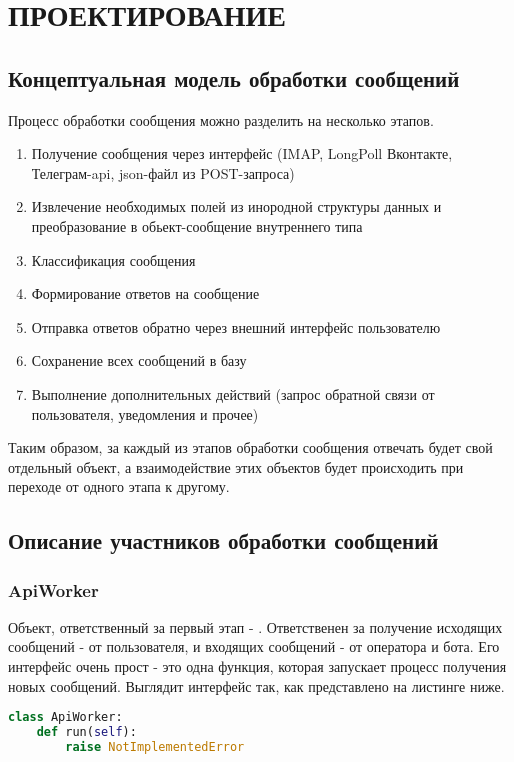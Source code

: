 \section{ПРОЕКТИРОВАНИЕ}
    \subsection{Концептуальная модель обработки сообщений}
    Процесс обработки сообщения можно разделить на несколько этапов.
    \begin{enumerate}
        \item Получение сообщения через интерфейс (IMAP, LongPoll Вконтакте, Телеграм-api, json-файл из POST-запроса)
        \item Извлечение необходимых полей из инородной структуры данных и преобразование в обьект-сообщение внутреннего типа
        \item Классификация сообщения
        \item Формирование ответов на сообщение
        \item Отправка ответов обратно через внешний интерфейс пользователю
        \item Сохранение всех сообщений в базу
        \item Выполнение дополнительных действий (запрос обратной связи от пользователя, уведомления и прочее)
    \end{enumerate}

    Таким образом, за каждый из этапов обработки сообщения отвечать будет свой отдельный объект,
    а взаимодействие этих объектов будет происходить при переходе от одного этапа к другому.
    
    \subsection{Описание участников обработки сообщений}
    \subsubsection*{ApiWorker}
    Объект, ответственный за первый этап - . Ответственен за получение
    исходящих сообщений - от пользователя, и входящих сообщений - от оператора и бота.
    Его интерфейс очень прост - это одна функция, которая запускает процесс получения новых сообщений.
    Выглядит интерфейс так, как представлено на листинге ниже.
\begin{lstlisting}[language=Python]
class ApiWorker:
    def run(self):
        raise NotImplementedError
\end{lstlisting}

